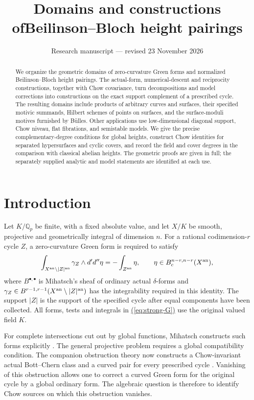 \documentclass[11pt,a4paper]{article}
\title{Domains and constructions of\newline Beilinson--Bloch height pairings}
\author{}
\date{Research manuscript --- revised 23 November 2026}
\theoremstyle{definition}
\theoremstyle{remark}\newtheorem{remark}[theorem]{Remark}
\numberwithin{equation}{section}
\newcommand{\Q}{\mathbb Q}\newcommand{\R}{\mathbb R}\newcommand{\C}{\mathbb C}
\newcommand{\D}{d'd''}\newcommand{\ob}{\mathfrak o}
\renewcommand{\eqref}[1]{\hyperref[#1]{\textcolor{equationlink}{(\ref*{#1})}}}
\begin{document}
\maketitle
\begin{abstract}
We organize the geometric domains of zero-curvature Green forms and normalized
Beilinson--Bloch height pairings. The actual-form, numerical-descent
and reciprocity constructions, together with Chow covariance, turn decompositions and model
corrections into constructions on the exact support complement of a prescribed
cycle. The resulting domains include products of arbitrary curves and
surfaces, their specified motivic summands, Hilbert schemes of points on
surfaces, and the surface-moduli motives furnished by B\"ulles. Other
applications use low-dimensional diagonal support, Chow niveau, flat
fibrations, and semistable models. We give the precise complementary-degree
conditions for global heights, construct Chow identities for separated
hypersurfaces and cyclic covers, and record the field and cover degrees in
the comparison with classical abelian heights. The geometric proofs are given
in full; the separately supplied analytic and model statements are identified
at each use.
\end{abstract}
\tableofcontents

\section{Introduction}\label{sec:intro}

Let $K/\Q_p$ be finite, with a fixed absolute value, and let $X/K$ be smooth,
projective and geometrically integral of dimension $n$. For a rational
codimension-$r$ cycle $Z$, a zero-curvature Green form is required to satisfy
\begin{equation}\label{eq:strong-G}
 \int_{X^{\an}\setminus |Z|^{\an}}\gamma_Z\wedge\D\eta
       =-\int_{Z^{\an}}\eta,
 \qquad \eta\in B_c^{n-r,n-r}(X^{\an}),
\end{equation}
where $B^{\bullet,\bullet}$ is Mihatsch's sheaf of ordinary actual
$\delta$-forms and
$\gamma_Z\in B^{r-1,r-1}(X^{\mathrm{an}}\setminus |Z|^{\mathrm{an}})$ has the
integrability required in this identity. The support $|Z|$ is the support of
the specified cycle after equal components have been collected. All forms,
tests and integrals in \eqref{eq:strong-G} use the original valued field $K$.

For complete intersections cut out by global functions, Mihatsch constructs
such forms explicitly \cite[Theorem 5.5]{Mihatsch}. The general projective
problem requires a global compatibility condition. The companion obstruction
theory now constructs a Chow-invariant actual Bott--Chern class and a curved
pair for every prescribed cycle \cite[Theorem 1.1]{ChowGreenPairs}. Vanishing of this obstruction
allows one to correct a curved Green form for the original cycle by a global
ordinary form. The algebraic question is therefore to identify Chow sources
on which this obstruction vanishes.
\end{document}
